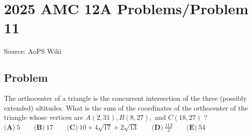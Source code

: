 \documentclass[12pt]{article}
\begin{document}
\section*{{2025 AMC 12A Problems/Problem 11}}
Source: AoPS Wiki

\subsection*{Problem}
The orthocenter of a triangle is the concurrent intersection of the three (possibly extended) altitudes. What is the sum of the coordinates of the orthocenter of the triangle whose vertices are $A(2,31), B(8,27),$ and $C(18,27)$ ? $\textbf{(A)}~5\qquad\textbf{(B)}~17\qquad\textbf{(C)}~10+4\sqrt{17} +2\sqrt{13}\qquad\textbf{(D)}~\frac{113}{3}\qquad\textbf{(E)}~54$
\end{document}
